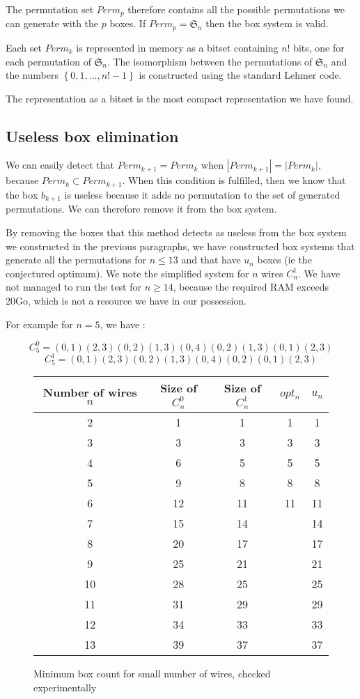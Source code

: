 \documentclass[11pt, a4paper]{article}
\begin{document}
The permutation set $Perm_p$ therefore contains all the possible permutations we
can generate with the $p$ boxes. If $Perm_p = \mathfrak{S}_n$ then the box system
is valid.

Each set $Perm_k$ is represented in memory as a bitset containing $n!$ bits, one
for each permutation of $\mathfrak{S}_n$. The isomorphism between the
permutations of $\mathfrak{S}_n$ and the numbers $\left\{0,1,\dots,n!-1\right\}$ is
constructed using the standard Lehmer code.

The representation as a bitset is the most compact representation we have found.

\subsection{Useless box elimination}

We can easily detect that $Perm_{k+1} = Perm_k$ when $ |Perm_{k+1}| = |Perm_k|$,
because $Perm_k \subset Perm_{k+1}$. When this condition is fulfilled, then we
know that the box $b_{k+1}$ is useless because it adds no permutation to the set
of generated permutations. We can therefore remove it from the box system.

By removing the boxes that this method detects as useless from the box system we
constructed in the previous paragraphs, we have constructed box systems that
generate all the permutations for $n \leq 13$ and that have $u_n$ boxes (ie the
conjectured optimum). We note the simplified system for $n$ wires $C_n^1$. We
have not managed to run the test for $n \geq 14$, because the required RAM
exceeds 20Go, which is not a resource we have in our possession.

For example for $n=5$, we have :

$$C_5^0 = (0,1)(2,3)(0,2)(1,3)(0,4)(0,2)(1,3)(0,1)(2,3)$$
$$C_5^1 = (0,1)(2,3)(0,2)(1,3)(0,4)(0,2)(0,1)(2,3)$$

\begin{figure}
    \centering
    \begin{tabular}{|c|c|c|c|c|}
    \hline
    Number of wires $n$ & Size of $C_n^0$ & Size of $C_n^1$ & $opt_n$ &
	$u_n$ \\
    \hline
    2 & 1 & 1 & 1 & 1 \\
    3 & 3 & 3 & 3 & 3 \\
    4 & 6 & 5 & 5 & 5\\
    5 & 9 & 8 & 8 & 8\\
    6 & 12 & 11 & 11 & 11 \\
    7 & 15 & 14 &   & 14\\
    8 & 20 & 17 &   & 17\\
    9 & 25 & 21 &   & 21\\
    10 & 28 & 25 &   & 25\\
    11 & 31 & 29 &   & 29\\
    12 & 34 & 33 &   & 33\\
    13 & 39 & 37 &   & 37\\
    \hline
    \end{tabular}
    \caption{Minimum box count for small number of wires, checked experimentally}
    \label{box-count}
\end{figure}
\end{document}
